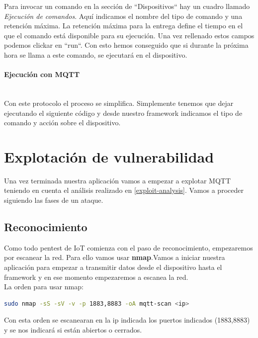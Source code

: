 {Para invocar un comando en la sección de ``Dispositivos`` hay un cuadro llamado \textit{Ejecución de comandos}. Aquí indicamos el nombre del tipo de comando y una retención máxima. La retención máxima para la entrega define el tiempo en el que el comando está disponible para su ejecución. Una vez rellenado estos campos podemos clickar en ``run``. Con esto hemos conseguido que si durante la próxima hora se llama a este comando, se ejecutará en el dispositivo.

\paragraph{Ejecución con MQTT}  \hspace{0pt} \\

Con este protocolo el proceso se simplifica. Simplemente tenemos que dejar ejecutando el siguiente código y desde nuestro framework indicamos el tipo de comando y acción sobre el dispositivo.

\section{Explotación de vulnerabilidad}

Una vez terminada nuestra aplicación vamos a empezar a explotar MQTT teniendo en cuenta el análisis realizado en \ref{exploit-analysis}. Vamos a proceder siguiendo las fases de un ataque.

\subsection{Reconocimiento}

Como todo pentest de IoT comienza con el paso de reconocimiento, empezaremos por escanear la red. Para ello vamos usar \textbf{nmap}.Vamos a iniciar nuestra aplicación para empezar a transmitir datos desde el dispositivo hasta el framework y en ese momento empezaremos a escanea la red. \\

La orden para usar nmap:

\begin{lstlisting}[language=bash]
sudo nmap -sS -sV -v -p 1883,8883 -oA mqtt-scan <ip>
\end{lstlisting}

Con esta orden se escanearan en la ip indicada los puertos indicados (1883,8883) y se nos indicará si están abiertos o cerrados. \\

}
